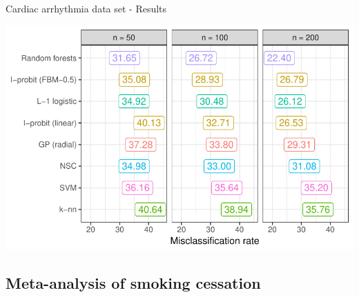 \documentclass{beamer}\usepackage[]{graphicx}\usepackage[]{color}
\makeatletter
\def\maxwidth{ %
  \ifdim\Gin@nat@width>\linewidth
    \linewidth
  \else
    \Gin@nat@width
  \fi
}
\newenvironment{knitrout}{}{} %
\makeatother
\begin{document}
\begin{frame}[fragile]{Cardiac arrhythmia data set - Results}
\begin{knitrout}\small
{}\color{fgcolor}

{\centering \includegraphics[width=\maxwidth]{figure/cardiac-res-plot-1} 

}



\end{knitrout}
\end{frame}

\subsection{Meta-analysis of smoking cessation}
\end{document}
